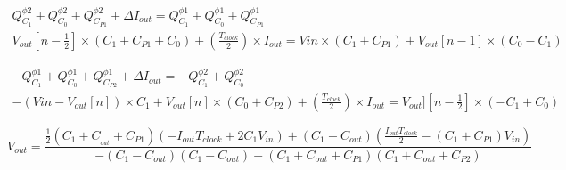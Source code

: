 \documentclass[12pt]{article}
\begin{document}
	{\footnotesize
	\begin{equation}
	\begin{array}{cc}
		Q^{\phi 2}_{C_1}+Q^{\phi 2}_{C_0}+Q^{\phi 2}_{C_{P1}}+\Delta I_{out} = Q^{\phi 1}_{C_1}+Q^{\phi 1}_{C_0}+Q^{\phi 1}_{C_{P1}}\\ [1em]	
		
		V_{out}[n-\frac{1}{2}]\times(C_1+C_{P1}+C_0)+(\frac{T_{clock}}{2})\times I_{out} = Vin\times(C_1+C_{P1})+V_{out}[n-1]\times(C_0-C_1)
	\end{array}
	\end{equation} }
	
	{\footnotesize
	\begin{equation}
	\begin{array}{cc}
		-Q^{\phi 1}_{C_1}+Q^{\phi 1}_{C_0}+Q^{\phi 1}_{C_{P2}}+\Delta I_{out} = -Q^{\phi 2}_{C_1}+Q^{\phi 2}_{C_0}\\ [1em]	
		
		-(Vin-V_{out}[n])\times C_1+V_{out}[n]\times (C_0+C_{P2})+(\frac{T_{clock}}{2})\times I_{out} = V_{out}][n-\frac{1}{2}]\times(-C_1+C_0)
	\end{array}
	\end{equation} }
	
	{\footnotesize
	\begin{equation}
	V_{out}=\frac{\frac{1}{2}(C_1+C_{_{out}}+C_{P1})(-I_{out}T_{clock}+2C_1V_{in})+(C_1-C_{out})(\frac{I_{out}T_{clock}}{2}-(C_1+C_{P1})V_{in})}
	{-(C_1-C_{out})(C_1-C_{out})+(C_1+C_{out}+C_{P1})(C_1+C_{out}+C_{P2})}
	\end{equation} }
	
\end{document}
